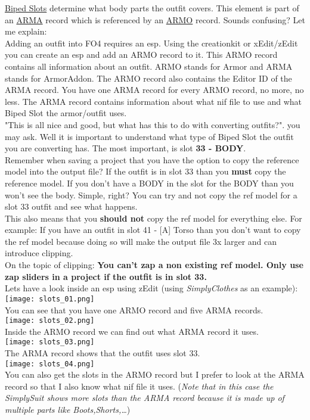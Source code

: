 \href{https://www.creationkit.com/fallout4/index.php?title=Biped_Slots}{Biped Slots} determine what body parts the outfit covers. 
This element is part of an \href{https://www.creationkit.com/fallout4/index.php?title=ArmorAddon}{ARMA} record which is referenced by 
an \href{https://www.creationkit.com/fallout4/index.php?title=Armor}{ARMO} record. Sounds confusing? Let me explain:\\
Adding an outfit into FO4 requires an esp. Using the creationkit or xEdit/zEdit you can create an esp and add an ARMO record to it.
This ARMO record contains all information about an outfit. ARMO stands for Armor and ARMA stands for ArmorAddon. The ARMO record also 
contains the Editor ID of the ARMA record. You have one ARMA record for every ARMO record, no more, no less. The ARMA record contains 
information about what nif file to use and what Biped Slot the armor/outfit uses.\\
"This is all nice and good, but what has this to do with converting outfits?". you may ask. Well it is important to understand 
what type of Biped Slot the outfit you are converting has. The most important, is slot \textbf{33 - BODY}.\\
Remember when saving a project that you have the option to copy the reference model into the output file? If the outfit is in slot 
33 than you \textbf{must} copy the reference model. If you don't have a BODY in the slot for the BODY than you won't see the body.
Simple, right? You can try and not copy the ref model for a slot 33 outfit and see what happens.\\
This also means that you \textbf{should not} copy the ref model for everything else. For example: If you have an outfit in slot 
41 - [A] Torso than you don't want to copy the ref model because doing so will make the output file 3x larger and can introduce
clipping.\\
On the topic of clipping: \textbf{You can't zap a non existing ref model. Only use zap sliders in a project if the outfit is in 
slot 33.}\\
Lets have a look inside an esp using zEdit (using \textit{SimplyClothes} as an example):\\
\texttt{[image: slots\_01.png]}\\
You can see that you have one ARMO record and five ARMA records.\\
\linebreak
\texttt{[image: slots\_02.png]}\\
Inside the ARMO record we can find out what ARMA record it uses.\\
\linebreak
\texttt{[image: slots\_03.png]}\\
The ARMA record shows that the outfit uses slot 33.\\
\linebreak
\texttt{[image: slots\_04.png]}\\
You can also get the slots in the ARMO record but I prefer to look at the ARMA record so that I also know what nif file it uses.
(\textit{Note that in this case the SimplySuit shows more slots than the ARMA record because it is made up of multiple parts 
like Boots,Shorts,\dots})
